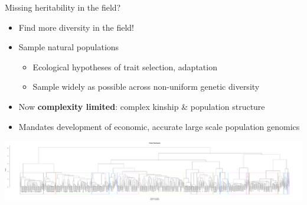 \documentclass[t]{beamer}
\begin{document}
\begin{frame}{Missing heritability in the field?}
  \begin{itemize}
    \item Find more diversity in the field!
    \item Sample natural populations
      \begin{itemize}
        \item Ecological hypotheses of trait selection, adaptation
        \item Sample widely as possible across non-uniform genetic diversity
      \end{itemize}
      \pause
    \item Now \textbf{complexity limited}: complex kinship \& population
      structure
    \item Mandates development of economic, accurate large scale population
      genomics
  \end{itemize}
  \begin{center}
    \includegraphics[width=\textwidth]{img/jared-tree.pdf}
  \end{center}
\end{frame}
\end{document}

